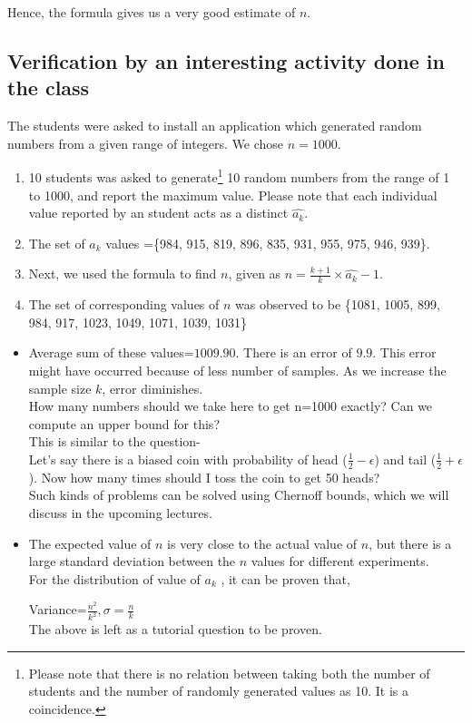\documentclass{llncs}
\begin{document}
Hence, the formula gives us a very good estimate of $n$.\\

\subsection{Verification by an interesting activity done in the class}

The students were asked to install an application which generated random numbers from a given range of integers. We chose $n=1000$. 

\begin{enumerate}
\item 10 students was asked to generate\footnote{Please note that there is no relation between taking both the number of students and the number of randomly generated values as 10. It is a coincidence.} 10 random numbers from the range of 1 to 1000, and report the maximum value. Please note that each individual value reported by an student acts as a distinct $\hat{a_k}.$
\item The set of $\hat{a_k}$ values =\{984, 915, 819, 896, 835, 931, 955, 975, 946, 939\}. 
\item Next, we used the formula to find $n$, given as $n= \frac{k+1}{k} \times \hat{a_k}-1$.
\item The set of corresponding values of $n$  was observed to be \{1081, 1005, 899, 984, 917, 1023, 1049, 1071, 1039, 1031\}\\
 \end{enumerate}

\begin{itemize}
\item Average sum of these values=$1009.90$. There is an error of $9.9$. This error might have occurred because of less number of samples. As we increase the sample size $k$, error diminishes.\\

How many numbers should we take here to get n=1000 exactly? Can we compute an upper bound for this?\\
This is similar to the question- \\
 Let's say there is a biased coin with probability of head ($\frac{1}{2} -\epsilon$) and tail ($\frac{1}{2} +\epsilon$). Now how many times should I toss the coin to get 50 heads?\\
Such kinds of problems can be solved using Chernoff bounds, which we will discuss in the upcoming lectures. 
\item The expected value of $n$ is very close to the actual value of $n$, but there is a large standard deviation between the $n$ values for different experiments.\\

For the distribution of value of ${a_k}$ , it can be proven that,
\begin{center}
Variance=$\frac{n^2}{k^2},\sigma=\frac{n}{k}$ \\
The above is left as a tutorial question to be proven.

\end{center}
\end{itemize}
\end{document}
